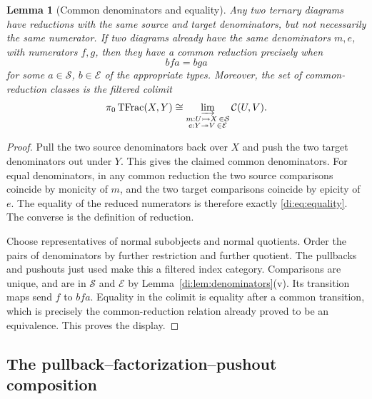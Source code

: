 \documentclass[11pt,reqno,a4paper]{amsart}
\newtheorem{lemma}[theorem]{Lemma}
\theoremstyle{definition}
\theoremstyle{remark}
\newcommand{\C}{\mathcal{C}}
\newcommand{\0}{\mathbf{0}}
\renewcommand{\1}{\mathbf{1}}
\newcommand{\tom}{\rightarrowtail}
\newcommand{\toe}{\twoheadrightarrow}
\newcommand{\Sden}{\mathcal S}
\newcommand{\Eden}{\mathcal E}
\DeclareMathOperator{\TFrac}{TFrac}
\begin{document}
\begin{lemma}[Common denominators and equality]\label{di:lem:common-denominators}
Any two ternary diagrams have reductions with the same source and
target denominators, but not necessarily the same numerator. If two
diagrams already have the same denominators $m,e$, with numerators
$f,g$, then they have a common reduction precisely when
\begin{equation}\label{di:eq:equality}
 bfa=bga
\end{equation}
for some $a\in\Sden$, $b\in\Eden$ of the appropriate types.
Moreover, the set of common-reduction classes is the filtered colimit
\begin{equation}\label{di:eq:epidd-colimit}
 \pi_0\TFrac(X,Y)\cong
 \varinjlim_{\substack{m:U\tom X\,\in\Sden\\
                       e:Y\toe V\,\in\Eden}}\C(U,V).
\end{equation}
\end{lemma}
\begin{proof}
Pull the two source denominators back over $X$ and push the two
target denominators out under $Y$. This gives the claimed common
denominators. For equal denominators, in any common reduction the
two source comparisons coincide by monicity of $m$, and the two
target comparisons coincide by epicity of $e$. The equality of the
reduced numerators is therefore exactly \eqref{di:eq:equality}.
The converse is the definition of reduction.

Choose representatives of normal subobjects and normal quotients.
Order the pairs of denominators by further restriction and further
quotient. The pullbacks and pushouts just used make this a filtered
index category. Comparisons are unique, and are in $\Sden$ and
$\Eden$ by Lemma~\ref{di:lem:denominators}(v). Its transition maps
send $f$ to $bfa$. Equality in the colimit is equality after a
common transition, which is precisely the common-reduction relation
already proved to be an equivalence. This proves the display.
\end{proof}

\subsection{The pullback--factorization--pushout composition}\label{subsec:di-composition}
\end{document}
